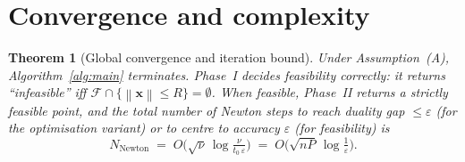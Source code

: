 \documentclass{amsart}
\newtheorem{theorem}{Theorem}
\newcommand{\norm}[1]{\left\lVert#1\right\rVert}
\begin{document}
\section{Convergence and complexity}\label{sec:conv}

\begin{theorem}[Global convergence and iteration bound]\label{thm:conv}
Under Assumption~(A), Algorithm~\ref{alg:main} terminates. Phase~I decides
feasibility correctly: it returns ``infeasible'' iff $\mathcal F\cap\{\norm{\bm
x}\le R\}=\emptyset$. When feasible, Phase~II returns a strictly feasible point, and
the total number of Newton steps to reach duality gap $\le\varepsilon$ (for the
optimisation variant) or to centre to accuracy $\varepsilon$ (for feasibility) is
\begin{equation}\label{eq:itbound}
  N_{\mathrm{Newton}}
  \;=\;O\!\Big(\sqrt{\nu}\,\log\tfrac{\nu}{t_0\,\varepsilon}\Big)
  \;=\;O\!\Big(\sqrt{nP}\,\log\tfrac{1}{\varepsilon}\Big).
\end{equation}
\end{theorem}
\end{document}
